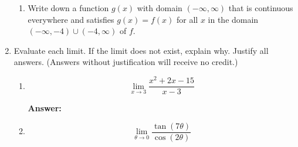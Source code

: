\documentclass[fleqn,12pt]{article}
\newcommand{\<}{\ensuremath{\langle}}
\renewcommand{\>}{\ensuremath{\rangle}}
\begin{document}
\begin{enumerate}
\begin{enumerate}[{\it i.}]
      \item Write down a function $g(x)$ with domain $(-\infty, \infty)$ that is
        continuous everywhere and satisfies $g(x) = f(x)$ for all $x$ in the
        domain $(-\infty, -4) \cup (-4, \infty)$ of $f$.
        
        \bigskip

        \bigskip
        


      \end{enumerate}


      \newpage

    \item Evaluate each limit.  If the limit does not exist, explain why.
      Justify all answers. (Answers without justification will receive no
      credit.)

      \begin{enumerate}[{\it i.}]
      \item 
        \label{item:4i}
        \[
        \lim_{x\rightarrow 3} \frac{x^2+2x - 15}{x-3}
        \]

        \bigskip
         {
          \hfill {\bf Answer:} \underline{\phantom{XXXXXXX}}
          \vskip4cm
        }
      \item 
        \label{item:4ii}
        \[
        \lim_{\theta \rightarrow 0} \frac{\tan(7\theta)}{\cos(2\theta)}
        \]


\end{enumerate}
\end{enumerate}
\end{document}
